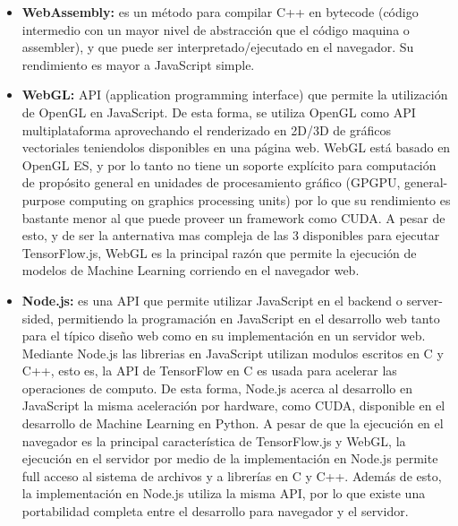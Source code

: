 \begin{itemize}
    \item \textbf{WebAssembly:} \cite{haasBringingWebSpeed2017} es un método para compilar C++ en bytecode (código intermedio con un mayor nivel de abstracción que el
código maquina o assembler), y que puede ser interpretado/ejecutado en el navegador.
Su rendimiento es mayor a JavaScript simple.\\

\item \textbf{WebGL:} \cite{WebGLOpenGLES2011} API (application programming interface) que permite la utilización de OpenGL en JavaScript. De esta forma,
se utiliza OpenGL como API multiplataforma aprovechando el renderizado en 2D/3D de gráficos vectoriales teniendolos
disponibles en una página web.
WebGL está basado en OpenGL ES, y por lo tanto no tiene un soporte explícito para computación de propósito general
en unidades de procesamiento gráfico (GPGPU, general-purpose computing on graphics processing units) por lo que su
rendimiento es bastante menor al que puede proveer un framework como CUDA. A pesar de esto, y de ser la anternativa
mas compleja de las 3 disponibles para ejecutar TensorFlow.js, WebGL es la principal razón que permite la ejecución
de modelos de Machine Learning corriendo en el navegador web.\\

\item \textbf{Node.js:} \cite{node.jsNodeJs} es una API que permite utilizar JavaScript en el backend o server-sided, permitiendo la programación en
JavaScript en el desarrollo web tanto para el típico diseño web como en su implementación en un servidor web.
Mediante Node.js las librerias en JavaScript utilizan modulos escritos en C y C++, esto es, la API de TensorFlow
en C es usada para acelerar las operaciones de computo. De esta forma, Node.js acerca al desarrollo en JavaScript
la misma aceleración por hardware, como CUDA, disponible en el desarrollo de Machine Learning en Python.
A pesar de que la ejecución en el navegador es la principal característica de TensorFlow.js y WebGL, la ejecución
en el servidor por medio de la implementación en Node.js permite full acceso al sistema de archivos y a librerías en
C y C++. Además de esto, la implementación en Node.js utiliza la misma API, por lo que existe una portabilidad
completa entre el desarrollo para navegador y el servidor.
\end{itemize}



